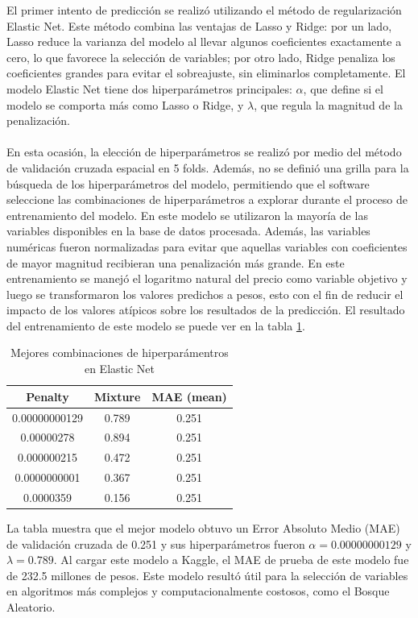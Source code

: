 \documentclass[article,11 pt]{article}
\begin{document}
El primer intento de predicción se realizó utilizando el método de regularización Elastic Net. Este método combina las ventajas de Lasso y Ridge: por un lado, Lasso reduce la varianza del modelo al llevar algunos coeficientes exactamente a cero, lo que favorece la selección de variables; por otro lado, Ridge penaliza los coeficientes grandes para evitar el sobreajuste, sin eliminarlos completamente. El modelo Elastic Net tiene dos hiperparámetros principales: $\alpha$, que define si el modelo se comporta más como Lasso o Ridge, y $\lambda$, que regula la magnitud de la penalización. 
\\
\\
En esta ocasión, la elección de hiperparámetros se realizó por medio del método de validación cruzada espacial en 5 folds. Además, no se definió una grilla para la búsqueda de los hiperparámetros del modelo, permitiendo que el software seleccione las combinaciones de hiperparámetros a explorar durante el proceso de entrenamiento del modelo. En este modelo se utilizaron la mayoría de las variables disponibles en la base de datos procesada. Además, las variables numéricas fueron normalizadas para evitar que aquellas variables con coeficientes de mayor magnitud recibieran una penalización más grande. En este entrenamiento se manejó el logaritmo natural del precio como variable objetivo y luego se transformaron los valores predichos a pesos, esto con el fin de reducir el impacto de los valores atípicos sobre los resultados de la predicción. El resultado del entrenamiento de este modelo se puede ver en la tabla \ref{tab:elasticnet_mae}. 

\begin{table}[H]
\centering
\caption{Mejores combinaciones de hiperparámentros en Elastic Net}
\begin{tabular}{ccc}
\hline
\textbf{Penalty} & \textbf{Mixture} & \textbf{MAE (mean)} \\
\hline
0.00000000129 & 0.789 & 0.251 \\
0.00000278    & 0.894 & 0.251 \\
0.000000215   & 0.472 & 0.251 \\
0.0000000001  & 0.367 & 0.251 \\
0.0000359     & 0.156 & 0.251 \\
\hline
\end{tabular}
\label{tab:elasticnet_mae}
\end{table}

La tabla muestra que el mejor modelo obtuvo un Error Absoluto Medio (MAE) de validación cruzada de 0.251 y sus hiperparámetros fueron $\alpha=0.00000000129$ y $\lambda=0.789$. Al cargar este modelo a Kaggle, el MAE de prueba de este modelo fue de 232.5 millones de pesos. Este modelo resultó útil para la selección de variables en algoritmos más complejos y computacionalmente costosos, como el Bosque Aleatorio.
\end{document}
